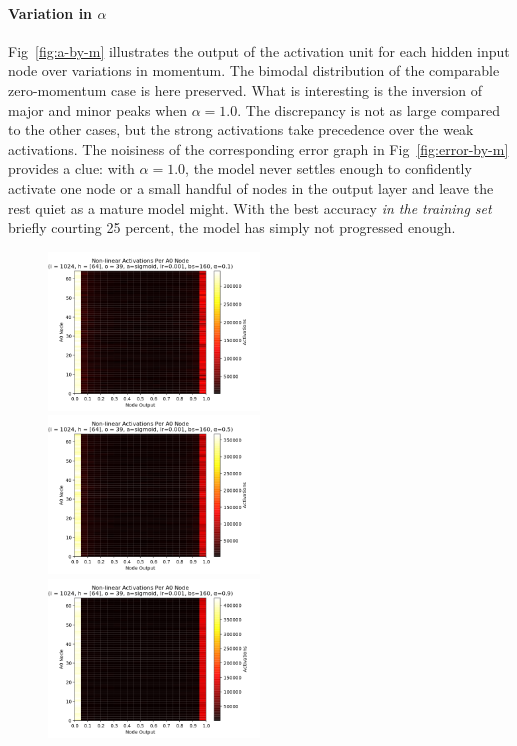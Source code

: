 \documentclass[10pt,epsf]{article}
\begin{document}
{{    \paragraph{Variation in $\alpha$}{
      Fig~\ref{fig:a-by-m} illustrates the output of the activation unit for each hidden input node
      over variations in momentum. The bimodal distribution of the comparable zero-momentum case
      is here preserved. What is interesting is the inversion of major and minor peaks when
      $\alpha = 1.0$. The discrepancy is not as large compared to the other cases, but the strong
      activations take precedence over the weak activations. The noisiness of the corresponding
      error graph in Fig~\ref{fig:error-by-m} provides a clue: with $\alpha = 1.0$, the model never
      settles enough to confidently activate one node or a small handful of nodes in the output
      layer and leave the rest quiet as a mature model might. With the best accuracy
      \emph{in the training set} briefly courting 25 percent, the model has simply not progressed enough.
    }
    \begin{figure}[H]
      \includegraphics[width=0.5\textwidth]{./img/64-0.001-160-0.1-sigmoid-1/activations-A0-255.png}
      \includegraphics[width=0.5\textwidth]{./img/64-0.001-160-0.5-sigmoid-1/activations-A0-255.png}
      \includegraphics[width=0.5\textwidth]{./img/64-0.001-160-0.9-sigmoid-1/activations-A0-255.png}

\end{figure}}}
\end{document}
